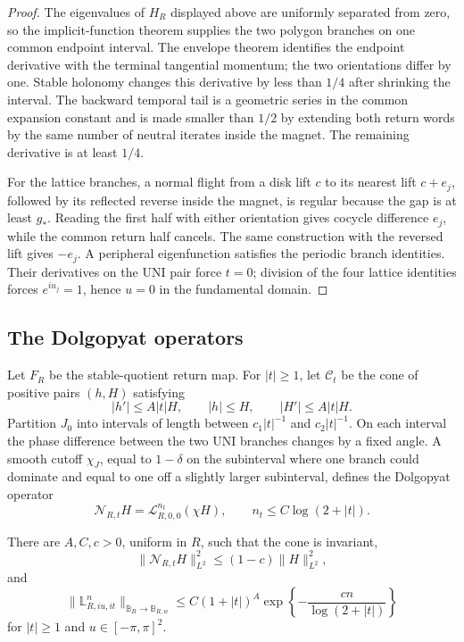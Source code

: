 \begin{proof}
The eigenvalues of \(H_R\) displayed above are uniformly separated from zero,
so the implicit-function theorem supplies the two polygon branches on one
common endpoint interval.  The envelope theorem identifies the endpoint
derivative with the terminal tangential momentum; the two orientations differ
by one.  Stable holonomy changes this derivative by less than \(1/4\) after
shrinking the interval.  The backward temporal tail is a geometric series in
the common expansion constant and is made smaller than \(1/2\) by extending
both return words by the same number of neutral iterates inside the magnet.
The remaining derivative is at least \(1/4\).

For the lattice branches, a normal flight from a disk lift \(c\) to its
nearest lift \(c+e_j\), followed by its reflected reverse inside the magnet,
is regular because the gap is at least \(g_*\).  Reading the first half with
either orientation gives cocycle difference \(e_j\), while the common return
half cancels.  The same construction with the reversed lift gives \(-e_j\).
A peripheral eigenfunction satisfies the periodic branch identities.  Their
derivatives on the UNI pair force \(t=0\); division of the four lattice
identities forces \(e^{iu_j}=1\), hence \(u=0\) in the fundamental domain.
\end{proof}

\subsection{The Dolgopyat operators}

Let \(F_R\) be the stable-quotient return map.  For \(|t|\ge1\), let
\(\mathcal C_t\) be the cone of positive pairs \((h,H)\) satisfying
\[
 |h'|\le A|t|H,\qquad |h|\le H,\qquad |H'|\le A|t|H.
\]
Partition \(J_0\) into intervals of length between
\(c_1|t|^{-1}\) and \(c_2|t|^{-1}\).  On each interval the phase difference
between the two UNI branches changes by a fixed angle.  A smooth cutoff
\(\chi_J\), equal to \(1-\delta\) on the subinterval where one branch could
dominate and equal to one off a slightly larger subinterval, defines the
Dolgopyat operator
\[
 \mathcal N_{R,t}H
 =\mathcal L_{R,0,0}^{n_t}(\chi H),
 \qquad n_t\le C\log(2+|t|).
\]

\begin{theorem}
\label{thm:r5-a2-dolgopyat}
There are \(A,C,c>0\), uniform in \(R\), such that the cone is invariant,
\[
 \|\mathcal N_{R,t}H\|_{L^2}^2
 \le(1-c)\|H\|_{L^2}^2,
\]
and
\[
 \|\mathbb L_{R,iu,it}^n\|_{\mathbb B_R\to\mathbb B_{R,w}}
 \le C(1+|t|)^A
 \exp\left\{-\frac{cn}{\log(2+|t|)}\right\}
\]
for \(|t|\ge1\) and \(u\in[-\pi,\pi]^2\).
\end{theorem}

